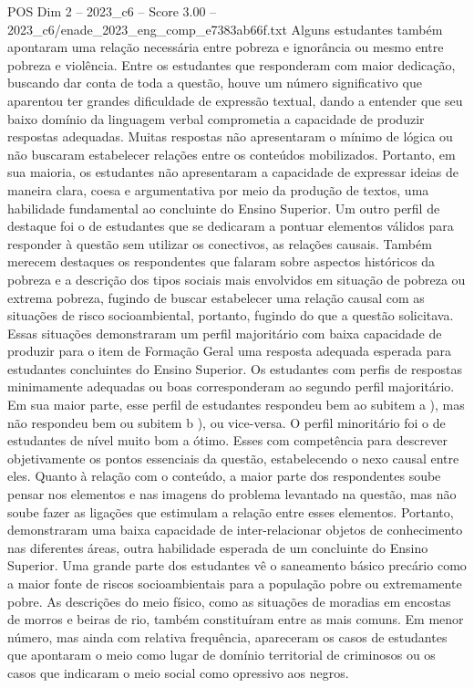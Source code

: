 \begin{textsample}{POS Dim 2 – 2023\_c6 – Score 3.00 – 2023\_c6/enade\_2023\_eng\_comp\_e7383ab66f.txt}
Alguns estudantes também apontaram uma relação necessária entre pobreza e ignorância ou mesmo entre pobreza e violência.
Entre os estudantes que responderam com maior dedicação, buscando dar conta de toda a questão, houve um número significativo que aparentou ter grandes dificuldade de expressão textual, dando a entender que seu baixo domínio da linguagem verbal comprometia a capacidade de produzir respostas adequadas.
Muitas respostas não apresentaram o mínimo de lógica ou não buscaram estabelecer relações entre os conteúdos mobilizados.
Portanto, em sua maioria, os estudantes não apresentaram a capacidade de expressar ideias de maneira clara, coesa e argumentativa por meio da produção de textos, uma habilidade fundamental ao concluinte do Ensino Superior.
Um outro perfil de destaque foi o de estudantes que se dedicaram a pontuar elementos válidos para responder à questão sem utilizar os conectivos, as relações causais.
Também merecem destaques os respondentes que falaram sobre aspectos históricos da pobreza e a descrição dos tipos sociais mais envolvidos em situação de pobreza ou extrema pobreza, fugindo de buscar estabelecer uma relação causal com as situações de risco socioambiental, portanto, fugindo do que a questão solicitava.
Essas situações demonstraram um perfil majoritário com baixa capacidade de produzir para o item de Formação Geral uma resposta adequada esperada para estudantes concluintes do Ensino Superior.
Os estudantes com perfis de respostas minimamente adequadas ou boas corresponderam ao segundo perfil majoritário.
Em sua maior parte, esse perfil de estudantes respondeu bem ao subitem a ), mas não respondeu bem ou subitem b ), ou vice-versa.
O perfil minoritário foi o de estudantes de nível muito bom a ótimo.
Esses com competência para descrever objetivamente os pontos essenciais da questão, estabelecendo o nexo causal entre eles.
Quanto à relação com o conteúdo, a maior parte dos respondentes soube pensar nos elementos e nas imagens do problema levantado na questão, mas não soube fazer as ligações que estimulam a relação entre esses elementos.
Portanto, demonstraram uma baixa capacidade de inter-relacionar objetos de conhecimento nas diferentes áreas, outra habilidade esperada de um concluinte do Ensino Superior.
Uma grande parte dos estudantes vê o saneamento básico precário como a maior fonte de riscos socioambientais para a população pobre ou extremamente pobre.
As descrições do meio físico, como as situações de moradias em encostas de morros e beiras de rio, também constituíram entre as mais comuns.
Em menor número, mas ainda com relativa frequência, apareceram os casos de estudantes que apontaram o meio como lugar de domínio territorial de criminosos ou os casos que indicaram o meio social como opressivo aos negros.

\end{textsample}
